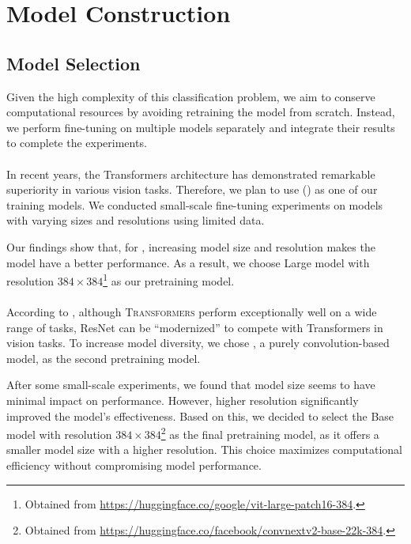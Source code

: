    \section{Model Construction}

\subsection{Model Selection}

Given the high complexity of this classification problem, we aim to conserve computational resources by avoiding retraining the model from scratch. Instead, we perform fine-tuning on multiple models separately and integrate their results to complete the experiments.

\paragraph{\VITFULL} In recent years, the Transformers \cite{vaswani2017attention} architecture has demonstrated remarkable superiority in various vision tasks. Therefore, we plan to use \VITFULL (\VIT) \cite{dosovitskiy2020vit} as one of our training models. We conducted small-scale fine-tuning experiments on models with varying sizes and resolutions using limited data.

Our findings show that, for \VIT, increasing model size and resolution makes the model have a better performance. As a result, we choose \VIT Large model with resolution $384\times 384$\footnote{Obtained from \url{https://huggingface.co/google/vit-large-patch16-384}.} as our pretraining model.

\paragraph{\CONV} According to \cite{liu2022convnet}, although \textsc{Transformers} perform exceptionally well on a wide range of tasks, ResNet \cite{he2016deep} can be ``modernized'' to compete with Transformers in vision tasks. To increase model diversity, we chose \CONV \cite{woo2023convnext}, a purely convolution-based model, as the second pretraining model.

After some small-scale experiments, we found that model size seems to have minimal impact on performance. However, higher resolution significantly improved the model's effectiveness. Based on this, we decided to select the \CONV Base model with resolution $384\times 384$\footnote{Obtained from \url{https://huggingface.co/facebook/convnextv2-base-22k-384}.} as the final pretraining model, as it offers a smaller model size with a higher resolution. This choice maximizes computational efficiency without compromising model performance.

